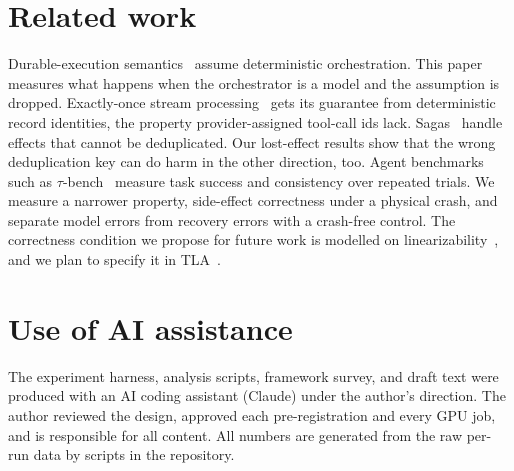 \documentclass[11pt]{article}
\begin{document}
\section{Related work}
Durable-execution semantics~\cite{burckhardt2021durable,skiadopoulos2021dbos}
assume deterministic orchestration. This paper measures what happens when the
orchestrator is a model and the assumption is dropped. Exactly-once stream
processing~\cite{akidau2013millwheel,carbone2017flink} gets its guarantee
from deterministic record identities, the property provider-assigned tool-call
ids lack. Sagas~\cite{garciamolina1987sagas} handle effects that cannot be
deduplicated. Our lost-effect results show that the wrong deduplication key
can do harm in the other direction, too. Agent benchmarks such as
$\tau$-bench~\cite{yao2024taubench} measure task success and consistency over
repeated trials. We measure a narrower property, side-effect correctness
under a physical crash, and separate model errors from recovery errors with
a crash-free control. The correctness condition we propose for future work is
modelled on linearizability~\cite{herlihy1990linearizability}, and we plan to
specify it in TLA~\cite{lamport1994tla}.

\section*{Use of AI assistance}
The experiment harness, analysis scripts, framework survey, and draft text
were produced with an AI coding assistant (Claude) under the author's
direction. The author reviewed the design, approved each pre-registration
and every GPU job, and is responsible for all content. All numbers are
generated from the raw per-run data by scripts in the repository.



\end{document}
